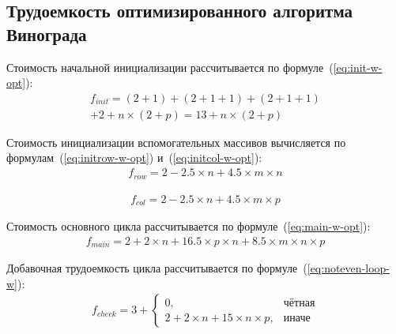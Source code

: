 \subsection{Трудоемкость оптимизированного алгоритма Винограда}

Стоимость начальной инициализации рассчитывается по формуле~(\ref{eq:init-w-opt}):
\begin{equation}
    \label{eq:init-w-opt}
    \begin{gathered}
        f_{init} = (2 + 1) + (2 + 1 + 1) + (2 + 1 + 1) \\
        + 2 + n \times (2 + p) = 13 + n \times (2 + p)
    \end{gathered} 
\end{equation}

Стоимость инициализации вспомогательных массивов вычисляется по формулам~(\ref{eq:initrow-w-opt}) и~(\ref{eq:initcol-w-opt}):
\begin{equation}
    \label{eq:initrow-w-opt}
    \begin{gathered}
        f_{row} = 2 - 2.5 \times n + 4.5 \times m \times n
    \end{gathered} 
\end{equation}

\begin{equation}
    \label{eq:initcol-w-opt}
    \begin{gathered}
        f_{col} = 2 - 2.5 \times n + 4.5 \times m \times p
    \end{gathered} 
\end{equation}

Стоимость основного цикла рассчитывается по формуле~(\ref{eq:main-w-opt}):
\begin{equation}
    \label{eq:main-w-opt}
    \begin{gathered}
        f_{main} = 2 + 2 \times n + 16.5 \times p \times n + 8.5 \times m \times n \times p
    \end{gathered} 
\end{equation}

Добавочная трудоемкость цикла рассчитывается по формуле~(\ref{eq:noteven-loop-w}):
\begin{equation}
    \label{eq:noteven-loop-w}
    \begin{gathered}
        f_{check} = 3 + 
        \begin{cases}
            0, & \text{чётная} \\
            2 + 2 \times n + 15 \times n \times p, & \text{иначе}
        \end{cases}
    \end{gathered}  
\end{equation}

